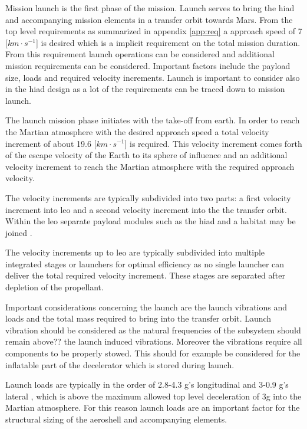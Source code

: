 Mission launch is the first phase of the mission. Launch serves to bring the \gls{hiad} and accompanying mission elements in a transfer orbit towards Mars. From the top level requirements as summarized in appendix \ref{app:req} a approach speed of 7 [$km\cdot s^{-1}$] is desired which is a implicit requirement on the total mission duration.
From this requirement launch operations can be considered and additional mission requirements can be considered. Important factors include the payload size, loads and required velocity increments. Launch is important to consider also in the \gls{hiad} design as a lot of the requirements can be traced down to mission launch.

The launch mission phase initiates with the take-off from earth. In order to reach the Martian atmosphere with the desired approach speed a total velocity increment of about 19.6 [$km\cdot s^{-1}$] is required. This velocity increment comes forth of the escape velocity of the Earth to its sphere of influence and an additional velocity increment to reach the Martian atmosphere with the required approach velocity.

The velocity increments are typically subdivided into two parts: a first velocity increment into \gls{leo} and a second velocity increment into the the transfer orbit. Within the \gls{leo} separate payload modules such as the \gls{hiad} and a habitat may be joined \cite{George2009}.

The velocity increments up to \gls{leo} are typically subdivided into multiple integrated stages or launchers for optimal efficiency as no single launcher can deliver the total required velocity increment. These stages are separated after depletion of the propellant.

Important considerations concerning the launch are the launch vibrations and loads and the total mass required to bring into the transfer orbit. Launch vibration should be considered as the natural frequencies of the subsystem should remain above?? the launch induced vibrations. Moreover the vibrations require all components to be properly stowed. This should for example be considered for the inflatable part of the decelerator which is stored during launch.

Launch loads are typically in the order of 2.8-4.3 g's longitudinal and 3-0.9 g's lateral \cite{Wertz2011}, which is above the maximum allowed top level deceleration of 3g into the Martian atmosphere. For this reason launch loads are an important factor for the structural sizing of the aeroshell and accompanying elements. 


